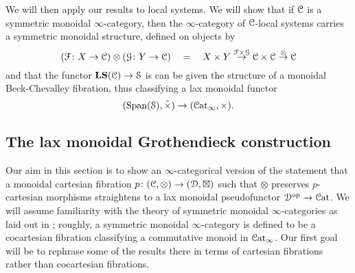 \documentclass[main.tex]{subfiles}
\begin{document}
We will then apply our results to local systems. We will show that if $\mathcal{C}$ is a symmetric monoidal $\infty$-category, then the $\infty$-category of $\mathcal{C}$-local systems carries a symmetric monoidal structure, defined on objects by
\begin{equation*}
  (\mathcal{F}\colon X \to \mathcal{C}) \otimes (\mathcal{G}\colon Y \to \mathcal{C}) \quad=\quad X \times Y \overset{\mathcal{F} \times \mathcal{G}}{\to} \mathcal{C} \times \mathcal{C} \overset{\otimes}{\to} \mathcal{C}
\end{equation*}
and that the functor $\mathbf{LS}(\mathcal{C}) \to \mathcal{S}$ is can be given the structure of a monoidal Beck-Chevalley fibration, thus classifying a lax monoidal functor
\begin{equation*}
  (\mathrm{Span}(\mathcal{S}), \tilde{\times}) \to (\mathcal{C}\mathrm{at}_{\infty}, \times).
\end{equation*}


\subsection{The lax monoidal Grothendieck construction}
\label{ssc:the_lax_monoidal_grothendieck_construction}

Our aim in this section is to show an $\infty$-categorical version of the statement that a monoidal cartesian fibration $p\colon (\mathcal{C}, \otimes) \to (\mathcal{D}, \boxtimes)$ such that $\otimes$ preserves $p$-cartesian morphisms straightens to a lax monoidal pseudofunctor $\mathcal{D}^{\mathrm{op}} \to \mathcal{C}\mathrm{at}$. We will assume familiarity with the theory of symmetric monoidal $\infty$-categories as laid out in \cite[Chap.~2]{luriehigheralgebra}; roughly, a symmetric monoidal $\infty$-category is defined to be a cocartesian fibration classifying a commutative monoid in $\mathcal{C}\mathrm{at}_{\infty}$. Our first goal will be to rephrase some of the results there in terms of cartesian fibrations rather than cocartesian fibrations.
\end{document}
